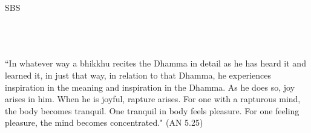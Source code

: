 \cleartorecto
\thispagestyle{empty}
\vspace*{3em}

{\centering

\settowidth{\titleLength}{%
  {\Large\chapterTitleFont\textsc{\MakeUppercase{{\thetitle}}}}%
}

{\Huge\fontsize{64}{16}\sbsFont SBS}\\[1.0\baselineskip]%

{\Huge\chapterTitleFont\textsc{{\thetitle\linebreak}}}\\[0.2\baselineskip]

\\[1.4\baselineskip]

{\Large\scshape \thesubtitle}\\[2.5\baselineskip]


{\quote “\Huge{I}n whatever way a bhikkhu recites the Dhamma in detail as he has heard it and learned it, in just that way, in relation to that Dhamma, he experiences inspiration in the meaning and inspiration in the Dhamma. As he does so, joy arises in him. When he is joyful, rapture arises. For one with a rapturous mind, the body becomes tranquil. One tranquil in body feels pleasure. For one feeling pleasure, the mind becomes concentrated." (AN 5.25)}\\[1.4\baselineskip]
}
